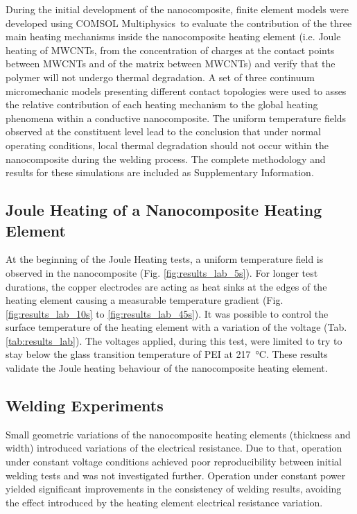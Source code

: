\documentclass[11pt,review,times]{elsarticle}
\begin{document}
During the initial development of the nanocomposite, finite element models were developed using COMSOL Mul\-ti\-phy\-sics\-\textregistered \ to evaluate the contribution of the three main heating mechanisms inside the nanocomposite heating element (i.e. Joule heating of MWCNTs, from the concentration of charges at the contact points between MWCNTs and of the matrix between MWCNTs) and verify that the polymer will not undergo thermal degradation.  
A set of three continuum micromechanic models presenting different contact topologies were used to asses the relative contribution of each heating mechanism to the global heating phenomena within a conductive nanocomposite. 
The uniform temperature fields observed at the constituent level lead to the conclusion that under normal operating conditions, local thermal degradation should not occur within the nanocomposite during the welding process. 
The complete methodology and results for these simulations are included as Supplementary Information. 

\subsection{Joule Heating of a Nanocomposite Heating Element}

At the beginning of the Joule Heating tests, a uniform temperature field is observed in the nanocomposite (Fig. \ref{fig:results_lab_5s}). 
For longer test durations, the copper electrodes are acting as heat sinks at the edges of the heating element causing a measurable temperature gradient (Fig. \ref{fig:results_lab_10s} to \ref{fig:results_lab_45s}). 
It was possible to control the surface temperature of the heating element with a variation of the voltage (Tab. \ref{tab:results_lab}). 
The voltages applied, during this test, were limited to try to stay below the glass transition temperature of PEI at \SI{217}{\celsius}. 
These results validate the Joule heating behaviour of the nanocomposite heating element. 

\subsection{Welding Experiments}

Small geometric variations of the nanocomposite heating elements (thickness and width) introduced variations of the electrical resistance. 
Due to that, operation under constant voltage conditions achieved poor reproducibility between initial welding tests and was not investigated further. 
Operation under constant power yielded significant improvements in the consistency of welding results, avoiding the effect introduced by the heating element electrical resistance variation. 
\end{document}

